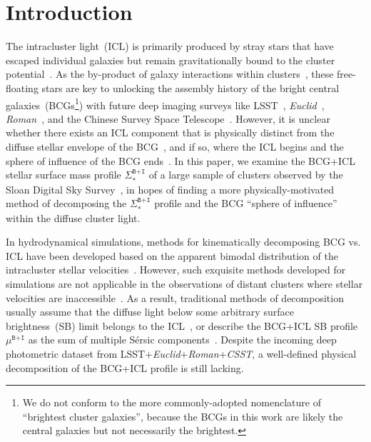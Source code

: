 \documentclass[fleqn,usenatbib]{mnras}
\newcommand{\sigbi}{\Sigma_*^{\texttt{B+I}}}
\newcommand{\mubi}{\mu^{\texttt{B+I}}}
\begin{document}



\vspace{1in}

\section{Introduction}
\label{sec:intro}


The intracluster light~(ICL) is primarily produced by stray stars that have
escaped individual galaxies but remain gravitationally bound to the cluster
potential~\citep{Zwicky1937, deVaucouleurs1970, Welch1971, Melnick1977,
Feldmeier2004, Mihos2005, Krick2007}. As the by-product of galaxy
interactions within clusters~\citep[for a recent review;
see][]{Contini2021a}, these free-floating stars are key to unlocking the
assembly history of the bright central galaxies~(BCGs\footnote{We do not
conform to the more commonly-adopted nomenclature of ``brightest cluster
galaxies'', because the BCGs in this work are likely the
central galaxies but not necessarily the brightest.}) with
future deep imaging surveys like LSST~\citep[{\it Rubin};][]{Ivezic2019},
{\it Euclid}~\citep{Laureijs2011}, {\it Roman}~\citep{Spergel2015}, and the
Chinese Survey Space Telescope~\citep[{\it CSST};][]{Gong2019}. However, it
is unclear whether there exists an ICL component that is physically
distinct from the diffuse stellar envelope of the BCG~\citep{Kormendy1974},
and if so, where the ICL begins and the sphere of influence of the BCG
ends~\citep{Doherty2009}. In this paper, we examine the BCG+ICL stellar
surface mass profile $\sigbi$ of a large sample of clusters observed by the
Sloan Digital Sky Survey~\citep[SDSS;][]{York2000}, in hopes of finding a
more physically-motivated method of decomposing the $\sigbi$ profile and
the BCG ``sphere of influence'' within the diffuse cluster light.


In hydrodynamical simulations, methods for kinematically decomposing
BCG vs. ICL have been developed based on the apparent bimodal
distribution of the intracluster stellar velocities~\citep{Dolag2010,
Cui2014}. However, such exquisite methods developed for simulations are not
applicable in the observations of distant clusters where stellar velocities
are inaccessible~\citep[but see][for kinematic studies of ICL in local
clusters]{Arnaboldi1996, Romanowsky2012, Longobardi2015, Spiniello2018,
Gu2020}. As a result, traditional methods of decomposition usually assume
that the diffuse light below some arbitrary surface brightness~(SB) limit
belongs to the ICL~\citep{Rudick2011, Burke2012, Presotto2014, Tang2018,
Furnell2021}, or describe the BCG+ICL SB profile $\mubi$ as the sum of
multiple S\'ersic components~\citep{Gonzalez2005, Seigar2007, Donzelli2011,
Cooper2015, Zhang2019, Montes2021, Kluge2021}. Despite the incoming deep
photometric dataset from LSST+{\it Euclid}+{\it Roman}+{\it CSST}, a
well-defined physical decomposition of the BCG+ICL profile is still
lacking.
\end{document}
